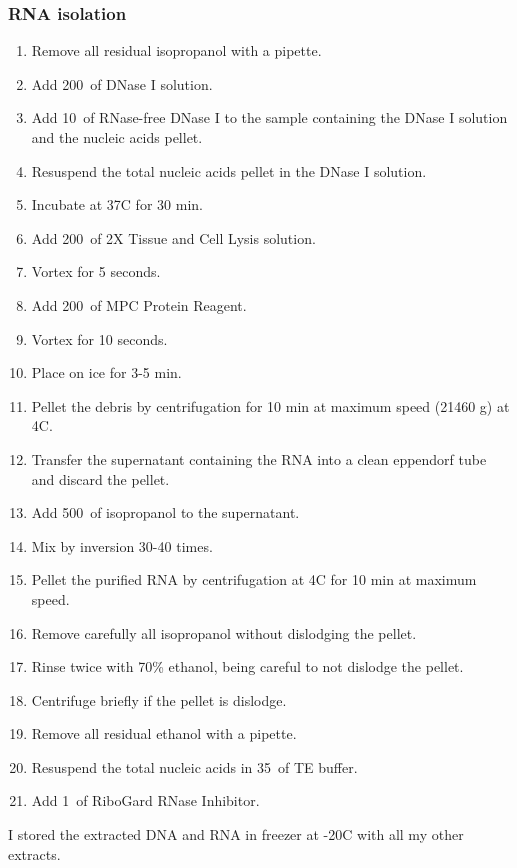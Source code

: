 \subsubsection{RNA isolation}

\begin{enumerate}
\item Remove all residual isopropanol with a pipette.
\item Add 200~\uL of DNase I solution.
\item Add 10~\uL of RNase-free DNase I to the sample containing the DNase I solution and the nucleic acids pellet.
\item Resuspend the total nucleic acids pellet in the DNase I solution.
\item Incubate at 37\degree C for 30 min.
\item Add 200~\uL of 2X Tissue and Cell Lysis solution.
\item Vortex for 5 seconds.
\item Add 200~\uL of MPC Protein Reagent.
\item Vortex for 10 seconds.
\item Place on ice for 3-5 min.
\item Pellet the debris by centrifugation for 10 min at maximum speed (21460 g) at 4\degree C.
\item Transfer the supernatant containing the RNA into a clean eppendorf tube and discard the pellet.
\item Add 500~\uL of isopropanol to the supernatant.
\item Mix by inversion 30-40 times.
\item Pellet the purified RNA by centrifugation at 4\degree C for 10 min at maximum speed.
\item Remove carefully all isopropanol without dislodging the pellet.
\item Rinse twice with 70\% ethanol, being careful to not dislodge the pellet.
\item Centrifuge briefly if the pellet is dislodge.
\item Remove all residual ethanol with a pipette.
\item Resuspend the total nucleic acids in 35~\uL of TE buffer.
\item Add 1~\uL of RiboGard RNase Inhibitor.
\end{enumerate}

I stored the extracted DNA and RNA in freezer at -20\degree C with all my other extracts.

